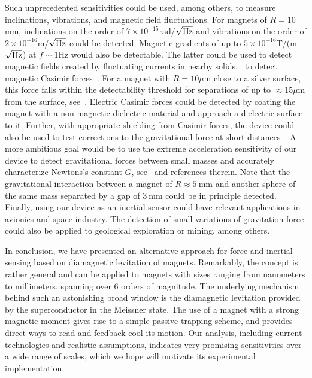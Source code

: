 \documentclass[twocolumn,superscriptaddress,floatfix,preprintnumbers,prl]{revtex4}
\begin{document}
 
Such unprecedented sensitivities could be used, among others, to measure inclinations, vibrations, and magnetic field fluctuations. For magnets of $R=10$mm, inclinations on the order of
$7 \times 10^{-15}$rad/$\sqrt{\rm Hz}$
and vibrations on the order of 
$2 \times 10^{-16}$m/$\sqrt{\rm Hz}$ could be detected. Magnetic gradients of up to $5\times10^{-16}$T/(m$\sqrt{\rm Hz}$) at $f\sim 1$Hz would also be detectable.
The latter could be used to detect magnetic fields created by fluctuating currents in nearby solids, \ie~to detect magnetic Casimir forces~\cite{henkel1999}.
For a magnet with $R=10\mu$m close to a silver surface, this force falls within the detectability threshold for separations of up to $\approx15\mu$m  from the surface, see~\cite{SM}.
Electric Casimir forces could be detected by coating the magnet with a non-magnetic dielectric material and approach a dielectric surface to it.  
Further, with appropriate shielding from Casimir forces, the device could also be used to test corrections to the gravitational force at short distances~\cite{Geraci2008,Geraci2010,ArkaniHamed1998}.
A more ambitious goal would be to use the extreme acceleration sensitivity of our device to detect gravitational forces between small masses and accurately characterize Newtons's constant $G$, see~\cite{Schmole2016} and references therein.
Note that the gravitational interaction between a magnet of $R\approx5~\text{mm}$ and another sphere of the same mass separated by a gap of $3~\text{mm}$ could be in principle detected.
Finally, using our device as an inertial sensor could have relevant applications in avionics and space industry. The detection of small variations of gravitation force could also be applied to geological exploration or mining, among others. 



In conclusion, we have presented an alternative approach for force and inertial sensing based on diamagnetic levitation of magnets. Remarkably, the concept is rather general and can be applied to magnets with sizes ranging from nanometers to millimeters, spanning over 6 orders of magnitude. The underlying mechanism behind such an astonishing broad window is the diamagnetic levitation provided by the superconductor in the Meissner state. 
The use of a magnet with a strong magnetic moment gives rise to a simple passive trapping scheme, and provides direct ways to read and feedback cool its motion.
Our analysis, including current technologies and realistic assumptions, indicates very promising sensitivities over a wide range of scales, which we hope will motivate its experimental implementation. 
\end{document}
